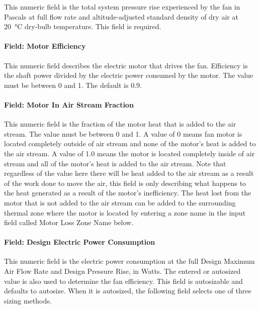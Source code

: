 This numeric field is the total system pressure rise experienced by the fan in Pascals at full flow rate and altitude-adjusted standard density of dry air at \SI{20}{\celsius} dry-bulb temperature. This field is required.

\paragraph{Field: Motor Efficiency}\label{field-motor-eff-fansysmodel}

This numeric field describes the electric motor that drives the fan.  Efficiency is the shaft power divided by the electric power consumed by the motor.  The value must be between 0 and 1. The default is 0.9.

\paragraph{Field: Motor In Air Stream Fraction}\label{field-motor-in-air-stream-fansysmodel}

This numeric field is the fraction of the motor heat that is added to the air stream.  The value must be between 0 and 1.  A value of 0 means fan motor is located completely outside of air stream and none of the motor's heat is added to the air stream.  A value of 1.0 means the motor is located completely inside of air stream and all of the motor's heat is added to the air stream.  Note that regardless of the value here there will be heat added to the air stream as a result of the work done to move the air, this field is only describing what happens to the heat generated as a result of the motor's inefficiency. The heat lost from the motor that is not added to the air stream can be added to the surrounding thermal zone where the motor is located by entering a zone name in the input field called Motor Loss Zone Name below.

\paragraph{Field: Design Electric Power Consumption}\label{field-design-elec-power-fansysmodel}

This numeric field is the electric power consumption at the full Design Maximum Air Flow Rate and Design Pressure Rise, in Watts. The entered or autosized value is also used to determine the fan efficiency. This field is autosizable and defaults to autosize. When it is autosized, the following field selects one of three sizing methods.

